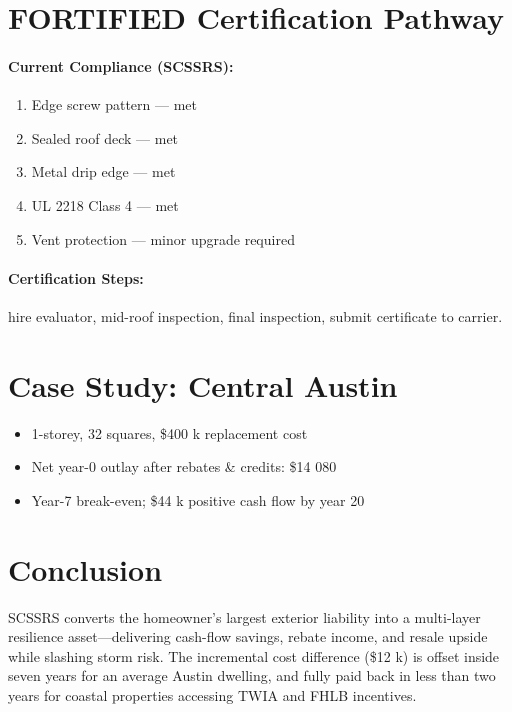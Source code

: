 \documentclass[11pt]{article}
\begin{document}
\section{FORTIFIED Certification Pathway}

\paragraph{Current Compliance (SCSSRS):}
\begin{enumerate}
    \item Edge screw pattern — met
    \item Sealed roof deck — met
    \item Metal drip edge — met
    \item UL 2218 Class 4 — met
    \item Vent protection — minor upgrade required
\end{enumerate}

\paragraph{Certification Steps:} hire evaluator, mid-roof inspection,
final inspection, submit certificate to carrier.

\section{Case Study: Central Austin}

\begin{itemize}
    \item 1-storey, 32 squares, \$400 k replacement cost
    \item Net year-0 outlay after rebates \& credits: \$14 080
    \item Year-7 break-even; \$44 k positive cash flow by year 20
\end{itemize}

\section{Conclusion}

SCSSRS converts the homeowner’s largest exterior liability into a
multi-layer resilience asset—delivering cash-flow savings, rebate income,
and resale upside while slashing storm risk.  The incremental cost
difference (\$12 k) is offset inside seven years for an average Austin
dwelling, and fully paid back in less than two years for coastal
properties accessing TWIA and FHLB incentives.
\end{document}
